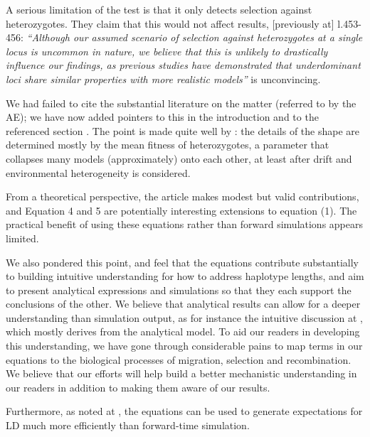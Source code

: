 \begin{point}{\revref}
    A serious limitation of the test is that it only detects selection against heterozygotes. They claim that this would not affect results, [previously at] l.453-456:
    \textit{``Although our assumed scenario of selection against heterozygotes at a single locus is uncommon in nature, we believe that this is unlikely to drastically influence our findings, as previous studies have demonstrated that underdominant loci share similar properties with more realistic models''}
    is unconvincing.
\end{point}

\reply
We had failed to cite the substantial literature on the matter (referred to by the AE);
we have now added pointers to this in the introduction  and to the referenced section \revref.
The point is made quite well by \citet{Slatkin1973}: the details of the shape are determined mostly by the mean fitness of heterozygotes,
a parameter that collapses many models (approximately) onto each other,
at least after drift and environmental heterogeneity is considered.

\begin{point}{}
    From a theoretical perspective, the article makes modest but valid contributions, and  Equation 4 and 5 are potentially interesting extensions to equation (1). 
    The practical benefit of using these equations rather than forward simulations appears limited.
\end{point}

\reply
We also pondered this point, and feel that the equations contribute substantially
to building intuitive understanding for how to address haplotype lengths,
and aim to present analytical expressions and simulations so that they each support the conclusions of the other.
We believe that analytical results can allow for a deeper understanding than simulation output,
as for instance the intuitive discussion at ,
which mostly derives from the analytical model.
To aid our readers in developing this understanding, we have gone through considerable pains to map terms in our equations to the biological processes of migration, selection and recombination. 
We believe that our efforts will help build a better mechanistic understanding in our readers in addition to making them aware of our results.

Furthermore, as noted at , the equations can be used to generate expectations for LD much more efficiently than forward-time simulation.

